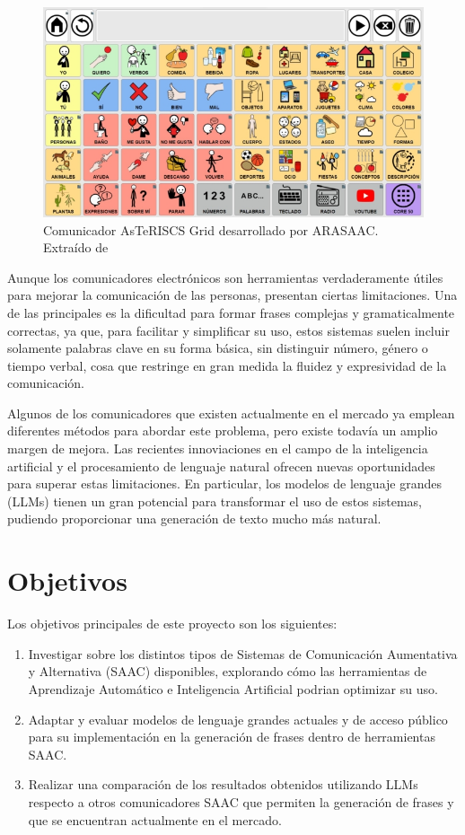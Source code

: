 \documentclass[11pt,spanish,listoffigures,listoftables]{tfgetsinf}
\begin{document}
\begin{figure}[h]
\includegraphics[scale = 0.8]{images/comunicador.jpg}
\centering
\caption{Comunicador AsTeRISCS Grid desarrollado por ARASAAC. Extraído de \cite{asterics_grid_comunicador}}
\label{fig:comunicador}
\end{figure}

Aunque los comunicadores electrónicos son herramientas verdaderamente útiles para mejorar la comunicación de las personas, presentan ciertas limitaciones. Una de las principales es la dificultad para formar frases complejas y gramaticalmente correctas, ya que, para facilitar y simplificar su uso, estos sistemas suelen incluir solamente palabras clave en su forma básica, sin distinguir número, género o tiempo verbal, cosa que restringe en gran medida la fluidez y expresividad de la comunicación.

Algunos de los comunicadores que existen actualmente en el mercado ya emplean diferentes métodos para abordar este problema, pero existe todavía un amplio margen de mejora. Las recientes innoviaciones en el campo de la inteligencia artificial y el procesamiento de lenguaje natural ofrecen nuevas oportunidades para superar estas limitaciones. En particular, los modelos de lenguaje grandes (LLMs) tienen un gran potencial para transformar el uso de estos sistemas, pudiendo proporcionar una generación de texto mucho más natural.

\section{Objetivos}

Los objetivos principales de este proyecto son los siguientes:

\begin{enumerate}
	\item Investigar sobre los distintos tipos de Sistemas de Comunicación Aumentativa y Alternativa (SAAC) disponibles, explorando cómo las herramientas de Aprendizaje Automático e Inteligencia Artificial podrian optimizar su uso.
	\item Adaptar y evaluar modelos de lenguaje grandes actuales y de acceso público para su implementación  en la generación de frases dentro de herramientas SAAC.
	\item Realizar una comparación de los resultados obtenidos utilizando LLMs respecto a otros comunicadores SAAC que permiten la generación de frases y que se encuentran actualmente en el mercado.
\end{enumerate}
\end{document}
